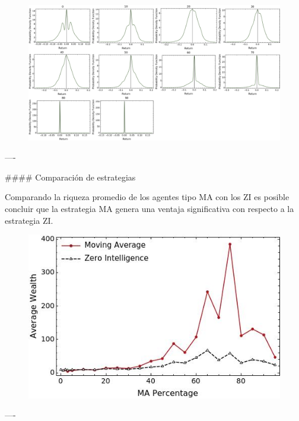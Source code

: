 \documentclass{beamer}
\begin{document}
\begin{frame}[fragile]
\begin{columns}[T]
\begin{column}{.46\textwidth}
\begin{markdown}
\begin{figure}[h!]
\centering
\includegraphics[scale=0.25]{img/dist_prices.png}
\end{figure}

----

#### Comparación de estrategias

Comparando la riqueza promedio de los agentes tipo MA con los ZI es posible concluir que la estrategia MA genera una ventaja significativa con respecto a la estrategia ZI.

\begin{figure}[h!]
\centering
\includegraphics[scale=0.4]{img/wealth_comparison.jpeg}
\end{figure}

----

\end{markdown}
\end{column}
\end{columns}

\end{frame}
\end{document}
